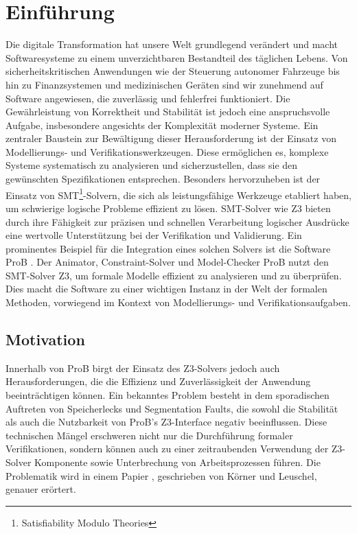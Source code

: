 

\section{Einführung}

Die digitale Transformation hat unsere Welt grundlegend verändert und macht Softwaresysteme zu einem unverzichtbaren Bestandteil des täglichen Lebens.
Von sicherheitskritischen Anwendungen wie der Steuerung autonomer Fahrzeuge bis hin zu Finanzsystemen und medizinischen Geräten sind wir zunehmend auf Software angewiesen,
die zuverlässig und fehlerfrei funktioniert.
Die Gewährleistung von Korrektheit und Stabilität ist jedoch eine anspruchsvolle Aufgabe,
insbesondere angesichts der Komplexität moderner Systeme.
Ein zentraler Baustein zur Bewältigung dieser Herausforderung ist der Einsatz von Modellierungs- und Verifikationswerkzeugen.
Diese ermöglichen es, komplexe Systeme systematisch zu analysieren und sicherzustellen,
dass sie den gewünschten Spezifikationen entsprechen.
Besonders hervorzuheben ist der Einsatz von SMT\footnote{Satisfiability Modulo Theories}-Solvern,
die sich als leistungsfähige Werkzeuge etabliert haben,
um schwierige logische Probleme effizient zu lösen.
SMT-Solver wie Z3 \cite{10.1007/978-3-540-78800-3_24} bieten durch ihre Fähigkeit zur präzisen und schnellen Verarbeitung logischer Ausdrücke eine wertvolle Unterstützung bei der Verifikation und Validierung.
Ein prominentes Beispiel für die Integration eines solchen Solvers ist die Software ProB \cite{leuschel2003prob}.
Der Animator, Constraint-Solver und Model-Checker ProB nutzt den SMT-Solver Z3, um formale Modelle effizient zu analysieren und zu überprüfen.
Dies macht die Software zu einer wichtigen Instanz in der Welt der formalen Methoden,
vorwiegend im Kontext von Modellierungs- und Verifikationsaufgaben.

\subsection{Motivation}

Innerhalb von ProB birgt der Einsatz des Z3-Solvers jedoch auch Herausforderungen, die die Effizienz und Zuverlässigkeit der Anwendung beeinträchtigen können.
Ein bekanntes Problem besteht in dem sporadischen Auftreten von Speicherlecks und Segmentation Faults,
die sowohl die Stabilität als auch die Nutzbarkeit von ProB's Z3-Interface negativ beeinflussen.
Diese technischen Mängel erschweren nicht nur die Durchführung formaler Verifikationen,
sondern können auch zu einer zeitraubenden Verwendung der Z3-Solver Komponente sowie Unterbrechung von Arbeitsprozessen führen.
Die Problematik wird in einem Papier \cite{10.1007/978-3-031-25803-9_5}, geschrieben von Körner und Leuschel, genauer erörtert.

